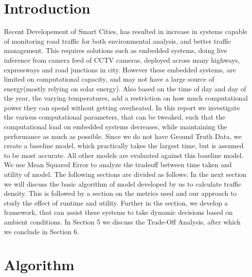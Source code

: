 \documentclass[conference]{IEEEtran}
\begin{document}
\section{Introduction}
Recent Developement of Smart Cities, has resulted in increase in systems capable of monitoring
road traffic for both environmental analysis, and better traffic management. This requires solutions such as embedded systems,
doing live inference from camera feed of CCTV cameras, deployed across many highways, expressways and road junctions in city.
However these embedded systems, are limited on computational capacity, and may not have a large source of energy(mostly relying on solar energy).
Also based on the time of day and day of the year, the varying temperatures, add a restriction on how much computational power they can spend without getting overheated.
In this report we investigate the various computational parameters, that can be tweaked, such that the computational load on embedded systems decreases, while maintaining
the performance as much as possible. Since we do not have Ground Truth Data,  we create a baseline model, which practically takes the largest time, but is assumed to be most accurate.
All other models are evaluated against this baseline model. We use Mean Squared Error to analyze the tradeoff between time taken and utility of model.
The following sections are divided as follows:
In the next section we will discuss the basic algorithm of model developed by us to calculate traffic density. This is followed by a section on the metrics used and our
approach to study the effect of runtime and utility. Further in the section, we develop a framework, that can assist these systems to take dynamic decisions based on ambient conditions.
In Section 5 we discuss the Trade-Off Analysis, after which we conclude in Section 6.




\section{Algorithm}
    
\end{document}
